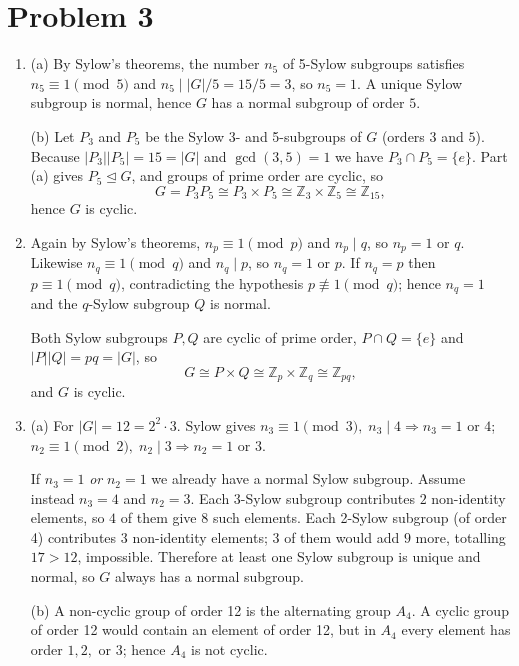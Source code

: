\documentclass[12pt]{article}
\begin{document}
\section*{Problem 3}
\begin{enumerate}[label=(\arabic*)]

\item
(a)  By Sylow’s theorems, the number \(n_{5}\) of 5-Sylow subgroups satisfies  
\(n_{5}\equiv 1 \pmod 5\) and \(n_{5}\mid |G|/5=15/5=3\), so \(n_{5}=1\).  
A unique Sylow subgroup is normal, hence \(G\) has a normal subgroup of order \(5\).

\smallskip
(b)  Let \(P_{3}\) and \(P_{5}\) be the Sylow 3- and 5-subgroups of \(G\) (orders \(3\) and \(5\)).  
Because \(|P_{3}||P_{5}|=15=|G|\) and \(\gcd(3,5)=1\) we have \(P_{3}\cap P_{5}=\{e\}\).  
Part (a) gives \(P_{5}\trianglelefteq G\), and groups of prime order are cyclic, so
\[
G=P_{3}P_{5}\cong P_{3}\times P_{5}\cong\mathbb Z_{3}\times\mathbb Z_{5}\cong\mathbb Z_{15},
\]
hence \(G\) is cyclic.

\item
Again by Sylow’s theorems, \(n_{p}\equiv 1\pmod p\) and \(n_{p}\mid q\), so \(n_{p}=1\) or \(q\).  
Likewise \(n_{q}\equiv 1\pmod q\) and \(n_{q}\mid p\), so \(n_{q}=1\) or \(p\).  
If \(n_{q}=p\) then \(p\equiv 1\pmod q\), contradicting the hypothesis \(p\not\equiv 1\pmod q\); hence \(n_{q}=1\) and the \(q\)-Sylow subgroup \(Q\) is normal.

Both Sylow subgroups \(P,Q\) are cyclic of prime order, \(P\cap Q=\{e\}\) and \(|P||Q|=pq=|G|\), so
\[
G\cong P\times Q\cong\mathbb Z_{p}\times\mathbb Z_{q}\cong\mathbb Z_{pq},
\]
and \(G\) is cyclic.

\item
(a)  For \(|G|=12=2^{2}\!\cdot 3\).  
Sylow gives \(n_{3}\equiv 1\pmod 3,\; n_{3}\mid 4\Rightarrow n_{3}=1\text{ or }4\);  
\(n_{2}\equiv 1\pmod 2,\; n_{2}\mid 3\Rightarrow n_{2}=1\text{ or }3\).

If \(n_{3}=1\) \emph{or} \(n_{2}=1\) we already have a normal Sylow subgroup.  
Assume instead \(n_{3}=4\) and \(n_{2}=3\).  
Each 3-Sylow subgroup contributes \(2\) non-identity elements, so \(4\) of them give \(8\) such elements.  
Each 2-Sylow subgroup (of order 4) contributes \(3\) non-identity elements; \(3\) of them would add \(9\) more, totalling \(17>12\), impossible.  
Therefore at least one Sylow subgroup is unique and normal, so \(G\) always has a normal subgroup.

\smallskip
(b)  A non-cyclic group of order 12 is the alternating group \(A_{4}\).  
A cyclic group of order 12 would contain an element of order 12, but in \(A_{4}\) every element has order \(1,2,\) or \(3\); hence \(A_{4}\) is not cyclic.

\end{enumerate}
\end{document}
